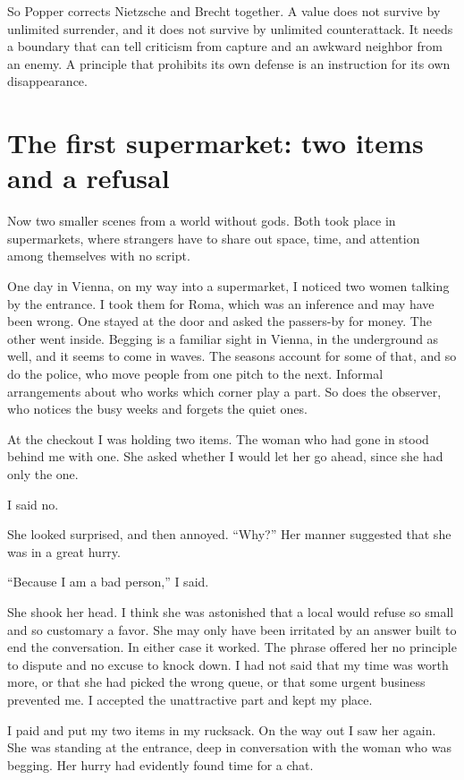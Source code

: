 \documentclass[12pt,a4paper]{book}
\begin{document}
So Popper corrects Nietzsche and Brecht together. A value does not survive by unlimited surrender, and it does not survive by unlimited counterattack. It needs a boundary that can tell criticism from capture and an awkward neighbor from an enemy. A principle that prohibits its own defense is an instruction for its own disappearance.

\section{The first supermarket: two items and a refusal}

Now two smaller scenes from a world without gods. Both took place in supermarkets, where strangers have to share out space, time, and attention among themselves with no script.

One day in Vienna, on my way into a supermarket, I noticed two women talking by the entrance. I took them for Roma, which was an inference and may have been wrong. One stayed at the door and asked the passers-by for money. The other went inside. Begging is a familiar sight in Vienna, in the underground as well, and it seems to come in waves. The seasons account for some of that, and so do the police, who move people from one pitch to the next. Informal arrangements about who works which corner play a part. So does the observer, who notices the busy weeks and forgets the quiet ones.

At the checkout I was holding two items. The woman who had gone in stood behind me with one. She asked whether I would let her go ahead, since she had only the one.

I said no.

She looked surprised, and then annoyed. ``Why?'' Her manner suggested that she was in a great hurry.

``Because I am a bad person,'' I said.

She shook her head. I think she was astonished that a local would refuse so small and so customary a favor. She may only have been irritated by an answer built to end the conversation. In either case it worked. The phrase offered her no principle to dispute and no excuse to knock down. I had not said that my time was worth more, or that she had picked the wrong queue, or that some urgent business prevented me. I accepted the unattractive part and kept my place.

I paid and put my two items in my rucksack. On the way out I saw her again. She was standing at the entrance, deep in conversation with the woman who was begging. Her hurry had evidently found time for a chat.
\end{document}
